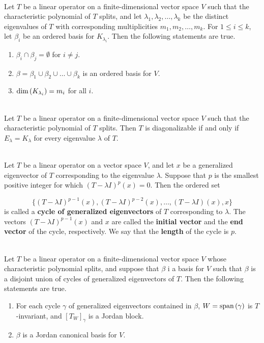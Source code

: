 \begin{theorem}\label{Theorem 7.4}
	\hfill\\
	Let $T$ be a linear operator on a finite-dimensional vector space $V$ such that the characteristic polynomial of $T$ splits, and let $\lambda_1, \lambda_2, \dots, \lambda_k$ be the distinct eigenvalues of $T$ with corresponding multiplicities $m_1, m_2, \dots, m_k$. For $1 \leq i \leq k$, let $\beta_i$ be an ordered basis for $K_{\lambda_i}$. Then the following statements are true.

	\begin{enumerate}
		\item $\beta_i \cap \beta_j = \emptyset$ for $i \neq j$.
		\item $\beta = \beta_1 \cup \beta_2 \cup \dots \cup \beta_k$ is an ordered basis for $V$.
		\item $\text{dim}\left(K_{\lambda_i}\right) = m_i$ for all $i$.
	\end{enumerate}
\end{theorem}

\begin{corollary}
	\hfill\\
	Let $T$ be a linear operator on a finite-dimensional vector space $V$ such that the characteristic polynomial of $T$ splits. Then $T$ is diagonalizable if and only if $E_\lambda = K_\lambda$ for every eigenvalue $\lambda$ of $T$.
\end{corollary}

\begin{definition}
	\hfill\\
	Let $T$ be a linear operator on a vector space $V$, and let $x$ be a generalized eigenvector of $T$ corresponding to the eigenvalue $\lambda$. Suppose that $p$ is the smallest positive integer for which $(T - \lambda I)^p(x) = 0$. Then the ordered set

	\[\{(T-\lambda I)^{p-1}(x), (T-\lambda I)^{p -2}(x), \dots, (T-\lambda I)(x), x\}\]
	is called a \textbf{cycle of generalized eigenvectors} of $T$ corresponding to $\lambda$. The vectors $(T-\lambda I)^{p-1}(x)$ and $x$ are called the \textbf{initial vector} and the \textbf{end vector} of the cycle, respectively. We say that the \textbf{length} of the cycle is $p$.
\end{definition}

\begin{theorem}\label{Theorem 7.5}
	\hfill\\
	Let $T$ be a linear operator on a finite-dimensional vector space $V$ whose characteristic polynomial splits, and suppose that $\beta$ i a basis for $V$ such that $\beta$ is a disjoint union of cycles of generalized eigenvectors of $T$. Then the following statements are true.

	\begin{enumerate}
		\item For each cycle $\gamma$ of generalized eigenvectors contained in $\beta$, $W = \text{span}\left(\gamma\right)$ is $T$-invariant, and $[T_W]_\gamma$ is a Jordan block.
		\item $\beta$ is a Jordan canonical basis for $V$.
	\end{enumerate}
\end{theorem}

